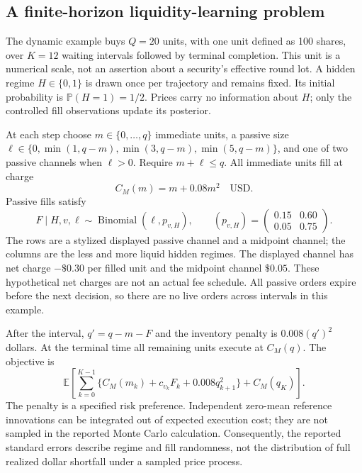 \documentclass[11pt]{article}
\numberwithin{equation}{section}
\theoremstyle{definition}
\theoremstyle{remark}
\newcommand{\E}{\mathbb{E}}
\theoremstyle{definition}
\newcommand{\Pp}{\mathbb P}
\begin{document}
\subsection{A finite-horizon liquidity-learning problem}

The dynamic example buys $Q=20$ units, with one unit defined as 100 shares,
over $K=12$ waiting intervals followed by terminal completion. This unit is
a numerical scale, not an assertion about a security's effective round lot.
A hidden regime $H\in\{0,1\}$ is drawn once per trajectory and remains fixed.
Its initial probability is $\Pp(H=1)=1/2$. Prices carry no information about
$H$; only the controlled fill observations update its posterior.

At each step choose $m\in\{0,\ldots,q\}$ immediate units, a passive size
$\ell\in\{0,\min(1,q-m),\min(3,q-m),\min(5,q-m)\}$, and one of two
passive channels when $\ell>0$. Require $m+\ell\leq q$. All immediate units
fill at charge
\begin{equation}\label{eq:simmarket}
 C_M(m)=m+0.08m^2\quad\text{USD}.
\end{equation}
Passive fills satisfy
\begin{equation}\label{eq:simfill}
 F\mid H,v,\ell\sim\operatorname{Binomial}(\ell,p_{v,H}),\qquad
 (p_{v,H})=\begin{pmatrix}0.15&0.60\\0.05&0.75\end{pmatrix}.
\end{equation}
The rows are a stylized displayed passive channel and a midpoint channel;
the columns are the less and more liquid hidden regimes. The displayed
channel has net charge $-\$0.30$ per filled unit and the midpoint channel
$\$0.05$. These hypothetical net charges are not an actual fee schedule.
All passive orders expire before the next decision, so there are no live
orders across intervals in this example.

After the interval, $q'=q-m-F$ and the inventory penalty is
$0.008(q')^2$ dollars. At the terminal time all remaining units execute at
$C_M(q)$. The objective is
\begin{equation}\label{eq:simobjective}
 \E\left[\sum_{k=0}^{K-1}
   \{C_M(m_k)+c_{v_k}F_k+0.008q_{k+1}^2\}+C_M(q_K)\right].
\end{equation}
The penalty is a specified risk preference. Independent zero-mean reference
innovations can be integrated out of expected execution cost; they are not
sampled in the reported Monte Carlo calculation. Consequently, the reported
standard errors describe regime and fill randomness, not the distribution
of full realized dollar shortfall under a sampled price process.
\end{document}
